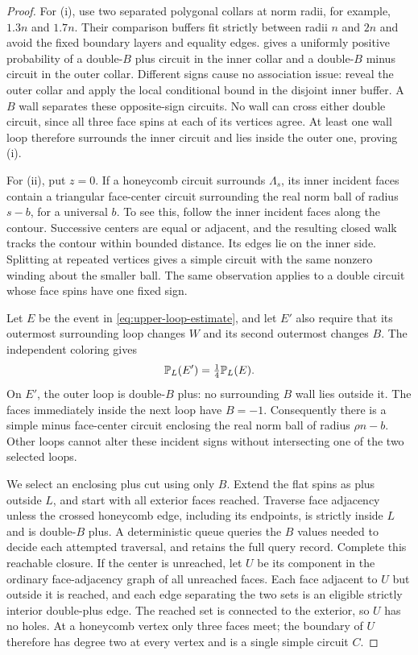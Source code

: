 \begin{proof}
For (i), use two separated polygonal collars at norm radii, for example,
$1.3n$ and $1.7n$.  Their comparison buffers fit strictly between radii
$n$ and $2n$ and avoid the fixed boundary layers and equality edges.
 gives a uniformly positive probability of a
double-$B$ plus circuit in the inner collar and a double-$B$ minus circuit
in the outer collar.  Different signs cause no association issue: reveal
the outer collar and apply the local conditional bound in the disjoint
inner buffer.  A $B$ wall separates these opposite-sign circuits.  No
wall can cross either double circuit, since all three face spins at each
of its vertices agree.  At least one wall loop therefore surrounds the
inner circuit and lies inside the outer one, proving (i).

For (ii), put $z=0$.  If a honeycomb circuit surrounds $\Lambda_s$, its
inner incident faces contain a triangular face-center circuit surrounding
the real norm ball of radius $s-b$, for a universal $b$.  To see this,
follow the inner incident faces along the contour.  Successive centers
are equal or adjacent, and the resulting closed walk tracks the contour
within bounded distance.  Its edges lie on the inner side.  Splitting at
repeated vertices gives a simple circuit with the same nonzero winding
about the smaller ball.  The same observation applies to a double
circuit whose face spins have one fixed sign.

Let $E$ be the event in \eqref{eq:upper-loop-estimate}, and let $E'$ also
require that its outermost surrounding loop changes $W$ and its second
outermost changes $B$.  The independent coloring gives
\begin{equation}\label{eq:two-loop-coloring}
                         \mathbb P_L(E')=\tfrac14\mathbb P_L(E).
\end{equation}
On $E'$, the outer loop is double-$B$ plus: no surrounding $B$ wall lies
outside it.  The faces immediately inside the next loop have $B=-1$.
Consequently there is a simple minus face-center circuit enclosing the
real norm ball of radius $\rho n-b$.  Other loops cannot alter these
incident signs without intersecting one of the two selected loops.

We select an enclosing plus cut using only $B$.  Extend the flat spins
as plus outside $L$, and start with all exterior faces reached.  Traverse
face adjacency unless the crossed honeycomb edge, including its endpoints,
is strictly inside $L$ and is double-$B$ plus.  A deterministic queue
queries the $B$ values needed to decide each attempted traversal, and
retains the full query record.  Complete this reachable closure.  If the
center is unreached, let $U$ be its component in the ordinary face-adjacency
graph of all unreached faces.  Each face adjacent to $U$ but outside it
is reached, and each edge separating the two sets is an eligible
strictly interior double-plus edge.  The reached set is connected to the
exterior, so $U$ has no holes.  At a honeycomb vertex only three faces
meet; the boundary of $U$ therefore has degree two at every vertex and
is a single simple circuit $C$.


\end{proof}
